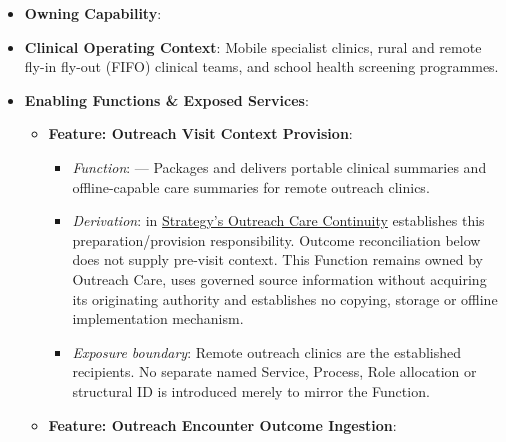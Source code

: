 \begin{itemize}

\item 
\textbf{Owning Capability}: \texttt{}



\item 
\textbf{Clinical Operating Context}: Mobile specialist clinics, rural and remote fly-in fly-out (FIFO) clinical teams, and school health screening programmes.



\item 
\textbf{Enabling Functions \& Exposed Services}:


\begin{itemize}

\item 
\textbf{Feature: Outreach Visit Context Provision}:


\begin{itemize}

\item 
\emph{Function}: \texttt{} — Packages and delivers portable clinical summaries and offline-capable care summaries for remote outreach clinics.



\item 
\emph{Derivation}: \texttt{} in \hyperref[rad:enabling:429]{Strategy's Outreach Care Continuity} establishes this preparation/\allowbreak{}provision responsibility. Outcome reconciliation below does not supply pre-visit context. This Function remains owned by Outreach Care, uses governed source information without acquiring its originating authority and establishes no copying, storage or offline implementation mechanism.



\item 
\emph{Exposure boundary}: Remote outreach clinics are the established recipients. No separate named Service, Process, Role allocation or structural ID is introduced merely to mirror the Function.



\end{itemize}


\item 
\textbf{Feature: Outreach Encounter Outcome Ingestion}:


\begin{itemize}


\end{itemize}
\end{itemize}
\end{itemize}
